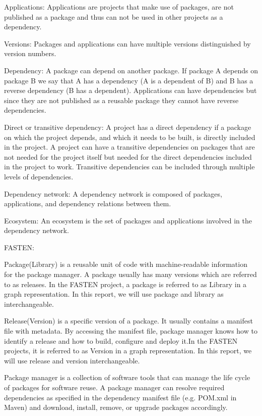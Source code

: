 Applications:
Applications are projects that make use of packages, are not published as a package and thus can not be used in other projects as a dependency.

Versions:
Packages and applications can have multiple versions distinguished by version numbers.

Dependency:
A package can depend on another package. If package A depends on package B we say that A has a dependency (A is a dependent of B) and B has a reverse dependency (B has a dependent). Applications can have dependencies but since they are not published as a reusable package they cannot have reverse dependencies.

Direct or transitive dependency:
A project has a direct dependency if a package on which the project depends, and which it needs to be built, is directly included in the project. A project can have a transitive dependencies on packages that are not needed for the project itself but needed for the direct dependencies included in the project to work. Transitive dependencies can be included through multiple levels of dependencies.

Dependency network:
A dependency network is composed of packages, applications, and dependency relations between them.

Ecosystem:
An ecosystem is the set of packages and applications involved in the dependency network.

\blankl
FASTEN:

Package(Library) is a reusable unit of code with machine-readable information for the package manager. A package usually has many versions which are referred to as releases. In the FASTEN project, a package is referred to as Library in a graph representation. In this report, we will use package and library as interchangeable.

Release(Version) is a specific version of a package. It usually contains a manifest file with metadata. By accessing the manifest file, package manager knows how to identify a release and how to build, configure and deploy it.In the FASTEN projects, it is referred to as Version in a graph representation. In this report, we will use release and version interchangeable.

Package manager is a collection of software tools that can manage the life cycle of packages for software reuse. A package manager can resolve required dependencies as specified in the dependency manifest file (e.g. POM.xml in Maven) and download, install, remove, or upgrade packages accordingly.


